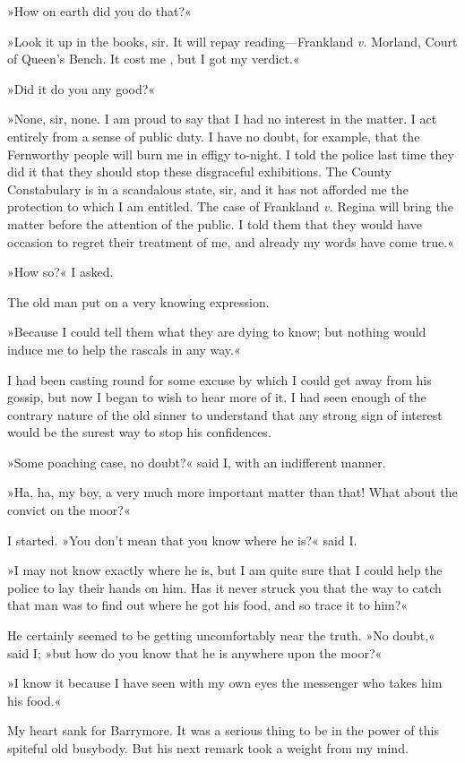 »How on earth did you do that?«

»Look it up in the books, sir. It will repay reading—Frankland \textit{v.} Morland, Court of Queen's Bench. It cost me , but I got my verdict.«

»Did it do you any good?«

»None, sir, none. I am proud to say that I had no interest in the matter. I act entirely from a sense of public duty. I have no doubt, for example, that the Fernworthy people will burn me in effigy to-night. I told the police last time they did it that they should stop these disgraceful exhibitions. The County Constabulary is in a scandalous state, sir, and it has not afforded me the protection to which I am entitled. The case of Frankland \textit{v.} Regina will bring the matter before the attention of the public. I told them that they would have occasion to regret their treatment of me, and already my words have come true.«

»How so?« I asked.

The old man put on a very knowing expression.

»Because I could tell them what they are dying to know; but nothing would induce me to help the rascals in any way.«

I had been casting round for some excuse by which I could get away from his gossip, but now I began to wish to hear more of it. I had seen enough of the contrary nature of the old sinner to understand that any strong sign of interest would be the surest way to stop his confidences.

»Some poaching case, no doubt?« said I, with an indifferent manner.

»Ha, ha, my boy, a very much more important matter than that! What about the convict on the moor?«

I started. »You don't mean that you know where he is?« said I.

»I may not know exactly where he is, but I am quite sure that I could help the police to lay their hands on him. Has it never struck you that the way to catch that man was to find out where he got his food, and so trace it to him?«

He certainly seemed to be getting uncomfortably near the truth. »No doubt,« said I; »but how do you know that he is anywhere upon the moor?«

»I know it because I have seen with my own eyes the messenger who takes him his food.«

My heart sank for Barrymore. It was a serious thing to be in the power of this spiteful old busybody. But his next remark took a weight from my mind.

